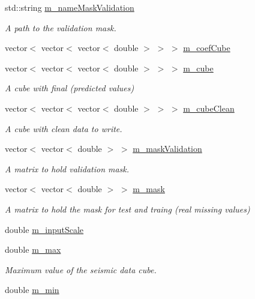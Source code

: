 \begin{DoxyCompactItemize}
std\+::string \hyperlink{classDataReader_a5b59718d2007d1bb2f7b502788df8752}{m\+\_\+name\+Mask\+Validation}
\begin{DoxyCompactList}\small\item\em A path to the validation mask. \end{DoxyCompactList}\item 
vector$<$ vector$<$ vector$<$ double $>$ $>$ $>$ \hyperlink{classDataReader_a27c2e4c67ca778cb720a3d56beb8ee7f}{m\+\_\+coef\+Cube}
\item 
vector$<$ vector$<$ vector$<$ double $>$ $>$ $>$ \hyperlink{classDataReader_a0a9bb36b0b16402e27008f4327e1bb92}{m\+\_\+cube}
\begin{DoxyCompactList}\small\item\em A cube with final (predicted values) \end{DoxyCompactList}\item 
vector$<$ vector$<$ vector$<$ double $>$ $>$ $>$ \hyperlink{classDataReader_a3647b5fff6dff6a92c8f2f83dfcfa055}{m\+\_\+cube\+Clean}
\begin{DoxyCompactList}\small\item\em A cube with clean data to write. \end{DoxyCompactList}\item 
vector$<$ vector$<$ double $>$ $>$ \hyperlink{classDataReader_afadf320f5ab08a34b8b06c839a8192e0}{m\+\_\+mask\+Validation}
\begin{DoxyCompactList}\small\item\em A matrix to hold validation mask. \end{DoxyCompactList}\item 
vector$<$ vector$<$ double $>$ $>$ \hyperlink{classDataReader_a8eb1e7630b4efd101708fb3b5a6856c6}{m\+\_\+mask}
\begin{DoxyCompactList}\small\item\em A matrix to hold the mask for test and traing (real missing values) \end{DoxyCompactList}\item 
double \hyperlink{classDataReader_a4dbda7a5c05acd673c2188ef37913e40}{m\+\_\+input\+Scale}
\item 
double \hyperlink{classDataReader_ad2afd61ea40bdaa3d6678adc1548a057}{m\+\_\+max}
\begin{DoxyCompactList}\small\item\em Maximum value of the seismic data cube. \end{DoxyCompactList}\item 
double \hyperlink{classDataReader_aba740a2b8be42c25449e1c91e0e03805}{m\+\_\+min}

\end{DoxyCompactItemize}
